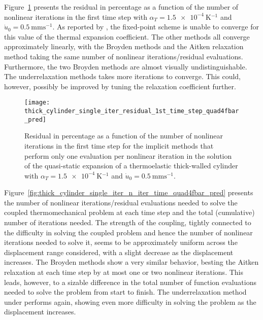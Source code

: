 Figure~\ref{fig:thick_cylinder_single_iter_residual_1st_time_step_quad4fbar_pred} presents the residual in percentage as a function of the number of nonlinear iterations in the first time step with \(\alpha_T=\SI{1.5e-4}{\kelvin^{-1}}\) and \(\dot u_0 =\SI{0.5}{\milli\meter\second^{-1}}\).
As reported by \cite{erbts_accelerated_2012}, the fixed-point scheme is unable to converge for this value of the thermal expansion coefficient.
The other methods all converge approximately linearly, with the Broyden methods and the Aitken relaxation method taking the same number of nonlinear iterations/residual evaluations.
Furthermore, the two Broyden methods are almost visually undistinguishable.
The underrelaxation methods takes more iterations to converge.
This could, however, possibly be improved by tuning the relaxation coefficient further.

\begin{figure}[htbp]
  \centering
  \texttt{[image: thick\_cylinder\_single\_iter\_residual\_1st\_time\_step\_quad4fbar\_pred]}
  \caption{Residual in percentage as a function of the number of nonlinear iterations in the first time step for the implicit methods that perform only one evaluation per nonlinear iteration in the solution of the quasi-static expansion of a thermoelastic thick-walled cylinder with \(\alpha_T=\SI{1.5e-4}{\kelvin^{-1}}\) and \(\dot u_0 =\SI{0.5}{\milli\meter\second^{-1}}\). }
\label{fig:thick_cylinder_single_iter_residual_1st_time_step_quad4fbar_pred}
\end{figure}

Figure~\ref{fig:thick_cylinder_single_iter_n_iter_time_quad4fbar_pred} presents the number of nonlinear iterations/residual evaluations needed to solve the coupled thermomechanical problem at each time step and the total (cumulative) number of iterations needed.
The strength of the coupling, tightly connected to the difficulty in solving the coupled problem and hence the number of nonlinear iterations needed to solve it, seems to be approximately uniform across the displacement range considered, with a slight decrease as the displacement increases.
The Broyden methods show a very similar behavior, besting the Aitken relaxation at each time step by at most one or two nonlinear iterations.
This leads, however, to a sizable difference in the total number of function evaluations needed to solve the problem from start to finish.
The underrelaxation method under performs again, showing even more difficulty in solving the problem as the displacement increases.

